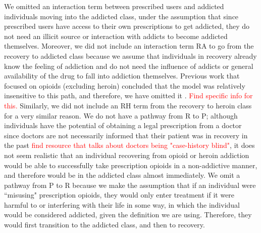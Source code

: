 \documentclass[12pt]{article}
\begin{document}
We omitted an interaction term between prescribed users and addicted individuals moving into the addicted class, under the assumption that since prescribed users have access to their own prescriptions to get addicted, they do not need an illicit source or interaction with addicts to become addicted themselves. Moreover, we did not include an interaction term RA to go from the recovery to addicted class because we assume that individuals in recovery already know the feeling of addiction and do not need the influence of addicts or general availability of the drug to fall into addiction themselves. Previous work that focused on opioids (excluding heroin) concluded that the model was relatively insensitive to this path, and therefore, we have omitted it \cite{Battista}. \textcolor{red}{Find specific info for this.} Similarly, we did not include an RH term from the recovery to heroin class for a very similar reason. We do not have a pathway from R to P; although individuals have the potential of obtaining a legal prescription from a doctor since doctors are not necessarily informed that their patient was in recovery in the past \textcolor{red}{find resource that talks about doctors being "case-history blind"}, it does not seem realistic that an individual recovering from opioid or heroin addiction would be able to successfully take prescription opioids in a non-addictive manner, and therefore would be in the addicted class almost immediately. We omit a pathway from P to R because we make the assumption that if an individual were ``misusing" prescription opioids, they would only enter treatment if it were harmful to or interfering with their life in some way, in which the individual would be considered addicted, given the definition we are using. Therefore, they would first transition to the addicted class, and then to recovery. \\
\end{document}
